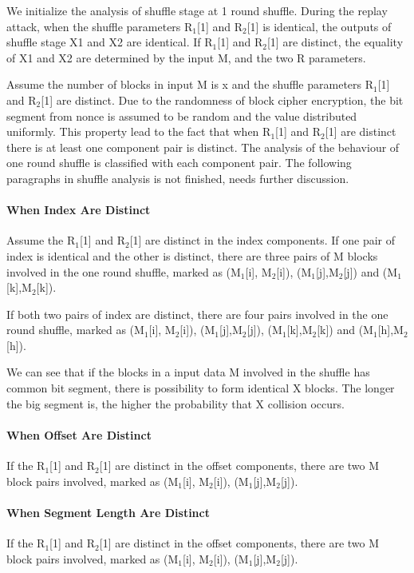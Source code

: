 \documentclass{article}
\begin{document}
We initialize the analysis of shuffle stage at 1 round shuffle. During the
replay attack, when the shuffle
parameters R$_1$[1] and R$_2$[1] is identical, the outputs of shuffle stage X1
and X2 are identical. If R$_1$[1] and R$_2$[1] are distinct, the equality of X1
and X2 are determined by the input M, and the two R parameters.

Assume the number of blocks in input M is x and the shuffle parameters R$_1$[1]
and R$_2$[1] are distinct. Due to the randomness of block cipher encryption, the
bit segment from nonce is assumed to be random and the value distributed
uniformly. This property lead to the fact that when R$_1$[1]
and R$_2$[1] are distinct there is at least one component pair is distinct. The
analysis of the behaviour of one round shuffle is classified with each component
pair. 
The following paragraphs in shuffle analysis is not finished, needs further
discussion.
\paragraph{When Index Are Distinct}
Assume the R$_1$[1] and R$_2$[1] are distinct in the index components. If one
pair of index is identical and the other is distinct, there are three pairs of M
blocks involved in the one round shuffle, marked as (M$_1$[i], M$_2$[i]),
(M$_1$[j],M$_2$[j]) and (M$_1$[k],M$_2$[k]).

If both two pairs of index are distinct, there are four pairs involved in the
one round shuffle, marked as (M$_1$[i], M$_2$[i]),
(M$_1$[j],M$_2$[j]), (M$_1$[k],M$_2$[k]) and (M$_1$[h],M$_2$[h]).

We can see that if the blocks in a input data M involved in the shuffle has
common bit segment, there is possibility to form identical X blocks.
The longer the big segment is, the higher the probability that X collision
occurs.
\paragraph{When Offset Are Distinct}
If the R$_1$[1] and R$_2$[1] are distinct in the offset components, there are
two M block pairs involved, marked as (M$_1$[i], M$_2$[i]),
(M$_1$[j],M$_2$[j]). 
\paragraph{When Segment Length Are Distinct}
If the R$_1$[1] and R$_2$[1] are distinct in the offset components, there are
two M block pairs involved, marked as (M$_1$[i], M$_2$[i]),
(M$_1$[j],M$_2$[j]). 
\end{document}
